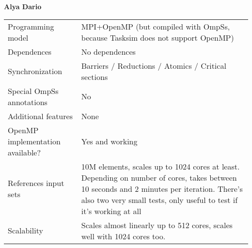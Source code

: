 \section*{}
\label{alya_dario}
\centering
\Huge
\textbf{Alya Dario}

\begin{table}[h!]
  \large
  \centering
  \begin{tabular}{|l|l|}
    \hline
    Programming model                & MPI+OpenMP (but compiled with OmpSs, because Tasksim does not support OpenMP) \\
    Dependences                      & No dependences \\
    Synchronization                  & Barriers / Reductions / Atomics / Critical sections \\
    Special OmpSs annotations        & No \\
    Additional features              & None \\
    OpenMP implementation available? & Yes and working \\
    References input sets            & 10M elements, scales up to 1024 cores at least. Depending on number of cores, takes between 10 seconds and 2 minutes per iteration. There's also two very small tests, only useful to test if it's working at all \\
    Scalability                      & Scales almost linearly up to 512 cores, scales well with 1024 cores too. \\
    \hline
  \end{tabular}
\end{table}


